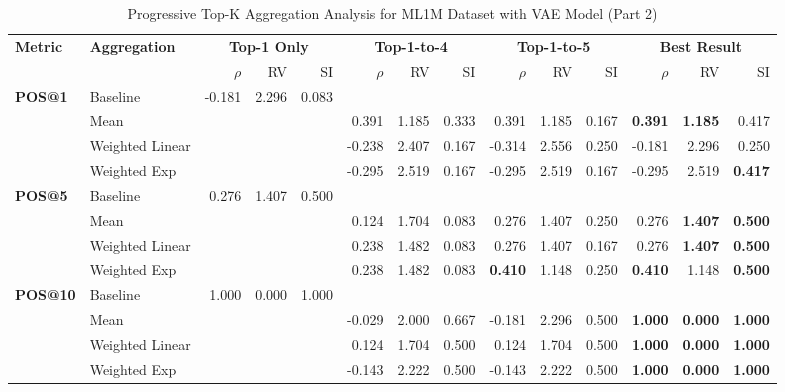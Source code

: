 \documentclass{article}
\begin{document}
\begin{table}[htbp]
\centering
\caption{Progressive Top-K Aggregation Analysis for ML1M Dataset with VAE Model (Part 2)}
\label{tab:ml1m_vae_progressive_topk_2}
\footnotesize
\begin{tabular}{@{}llrrr|rrr|rrr|rrr@{}}
\toprule
\multirow{2}{*}{\textbf{Metric}} & \multirow{2}{*}{\textbf{Aggregation}} & \multicolumn{3}{c|}{\textbf{Top-1 Only}} & \multicolumn{3}{c|}{\textbf{Top-1-to-4}} & \multicolumn{3}{c|}{\textbf{Top-1-to-5}} & \multicolumn{3}{c}{\textbf{Best Result}} \\
\cmidrule(lr){3-5} \cmidrule(lr){6-8} \cmidrule(lr){9-11} \cmidrule(lr){12-14}
& & $\rho$ & RV & SI & $\rho$ & RV & SI & $\rho$ & RV & SI & $\rho$ & RV & SI \\
\midrule

\multirow{4}{*}{\textbf{POS@1}} 
& Baseline & -0.181 & 2.296 & 0.083 & & & & & & & & & \\
& Mean & & & & 0.391 & 1.185 & 0.333 & 0.391 & 1.185 & 0.167 & \textbf{0.391} & \textbf{1.185} & 0.417 \\
& Weighted Linear & & & & -0.238 & 2.407 & 0.167 & -0.314 & 2.556 & 0.250 & -0.181 & 2.296 & 0.250 \\
& Weighted Exp & & & & -0.295 & 2.519 & 0.167 & -0.295 & 2.519 & 0.167 & -0.295 & 2.519 & \textbf{0.417} \\
\midrule

\multirow{4}{*}{\textbf{POS@5}} 
& Baseline & 0.276 & 1.407 & 0.500 & & & & & & & & & \\
& Mean & & & & 0.124 & 1.704 & 0.083 & 0.276 & 1.407 & 0.250 & 0.276 & \textbf{1.407} & \textbf{0.500} \\
& Weighted Linear & & & & 0.238 & 1.482 & 0.083 & 0.276 & 1.407 & 0.167 & 0.276 & \textbf{1.407} & \textbf{0.500} \\
& Weighted Exp & & & & 0.238 & 1.482 & 0.083 & \textbf{0.410} & 1.148 & 0.250 & \textbf{0.410} & 1.148 & \textbf{0.500} \\
\midrule

\multirow{4}{*}{\textbf{POS@10}} 
& Baseline & 1.000 & 0.000 & 1.000 & & & & & & & & & \\
& Mean & & & & -0.029 & 2.000 & 0.667 & -0.181 & 2.296 & 0.500 & \textbf{1.000} & \textbf{0.000} & \textbf{1.000} \\
& Weighted Linear & & & & 0.124 & 1.704 & 0.500 & 0.124 & 1.704 & 0.500 & \textbf{1.000} & \textbf{0.000} & \textbf{1.000} \\
& Weighted Exp & & & & -0.143 & 2.222 & 0.500 & -0.143 & 2.222 & 0.500 & \textbf{1.000} & \textbf{0.000} & \textbf{1.000} \\
\midrule


\end{tabular}
\end{table}
\end{document}
